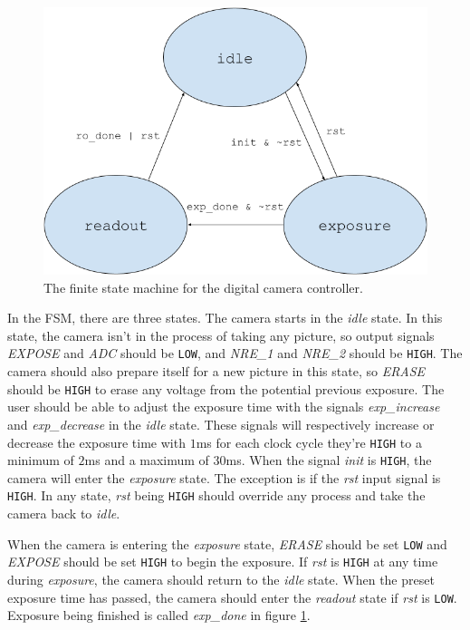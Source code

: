 \begin{figure}[H]
    \centering
    \includegraphics[width=\textwidth]{graphs/fsm.png}
    \caption{The finite state machine for the digital camera controller.}
    \label{fig:fsm}
\end{figure}

In the FSM, there are three states. The camera starts in the \emph{idle} state. In this state, the camera isn't in the process of taking any picture, so output signals \emph{EXPOSE} and \emph{ADC} should be \verb|LOW|, and \emph{NRE\_1} and \emph{NRE\_2} should be \verb|HIGH|. The camera should also prepare itself for a new picture in this state, so \emph{ERASE} should be \verb|HIGH| to erase any voltage from the potential previous exposure. The user should be able to adjust the exposure time with the signals \emph{exp\_increase} and \emph{exp\_decrease} in the \emph{idle} state. These signals will respectively increase or decrease the exposure time with $1$ms for each clock cycle they're \verb|HIGH| to a minimum of $2$ms and a maximum of $30$ms. When the signal \emph{init} is \verb|HIGH|, the camera will enter the \emph{exposure} state. The exception is if the \emph{rst} input signal is \verb|HIGH|. In any state, \emph{rst} being \verb|HIGH| should override any process and take the camera back to \emph{idle}.

When the camera is entering the \emph{exposure} state, \emph{ERASE} should be set \verb|LOW| and \emph{EXPOSE} should be set \verb|HIGH| to begin the exposure. If \emph{rst} is \verb|HIGH| at any time during \emph{exposure}, the camera should return to the \emph{idle} state. When the preset exposure time has passed, the camera should enter the \emph{readout} state if \emph{rst} is \verb|LOW|. Exposure being finished is called \emph{exp\_done} in figure \ref{fig:fsm}.

